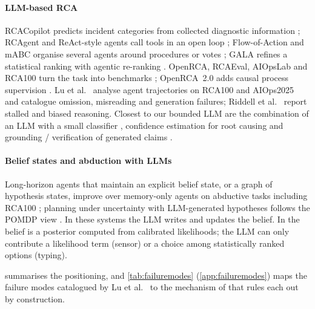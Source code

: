 \paragraph{LLM-based RCA}
RCACopilot predicts incident categories from collected diagnostic information \citep{chen2024rcacopilot}; RCAgent and ReAct-style
agents call tools in an open loop \citep{wang2024rcagent,yao2023react,roy2024exploring}; Flow-of-Action and mABC organise several
agents around procedures or votes \citep{pei2025flowofaction,zhang2024mabc}; GALA refines a statistical ranking with agentic
re-ranking \citep{tian2025gala}. OpenRCA, RCAEval, AIOpsLab and RCA100 turn the task into benchmarks
\citep{xu2025openrca,pham2025rcaeval,chen2025aiopslab,cai2026benchmark}; OpenRCA~2.0 adds causal process supervision
\citep{fang2026openrca2}. Lu et al.\ \citep{lu2026beyond} analyse agent trajectories on RCA100 and AIOps2025 and catalogue omission,
misreading and generation failures; Riddell et al.\ \citep{riddell2026stalled} report stalled and biased reasoning. Closest to our
bounded LLM are the combination of an LLM with a small classifier \citep{han2024oneshot}, confidence estimation for root causing
\citep{zhang2024lmpace} and grounding / verification of generated claims \citep{venktesh2025verify,gao2023alce}.

\paragraph{Belief states and abduction with LLMs}
Long-horizon agents that maintain an explicit belief state, or a graph of hypothesis states, improve over memory-only agents on
abductive tasks including RCA100 \citep{luo2026pos,luo2026graphofstates}; planning under uncertainty with LLM-generated hypotheses
follows the POMDP view \citep{kaelbling1998pomdp,tang2026trupomdp}. In these systems the LLM writes and updates the belief. In
\gama{} the belief is a posterior computed from calibrated likelihoods; the LLM can only contribute a likelihood term (sensor) or a
choice among statistically ranked options (typing).

 summarises the positioning, and \cref{tab:failuremodes} (\ref{app:failuremodes}) maps the failure modes
catalogued by Lu et al.\ \citep{lu2026beyond} to the mechanism of \gama{} that rules each out by construction.

